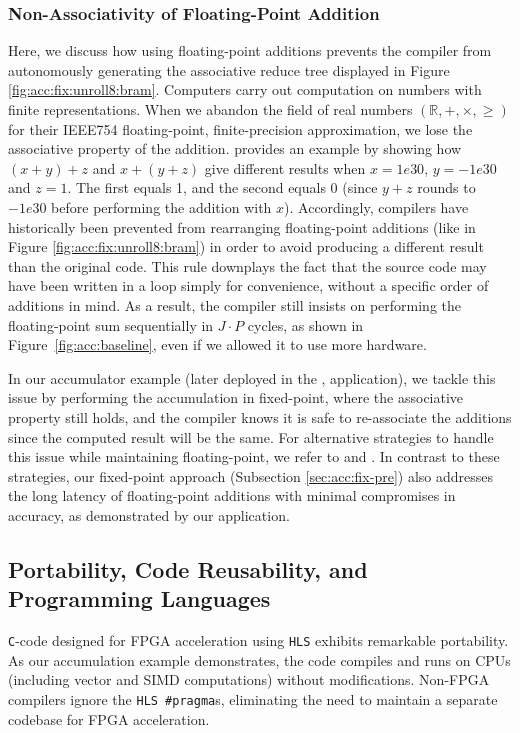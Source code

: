 \documentclass[12pt,american]{article}
\newcommand{\Naccsize}{J}
\begin{document}
\subsubsection{Non-Associativity of Floating-Point Addition} 

Here, we discuss how using floating-point additions prevents the compiler from autonomously generating the associative reduce tree displayed in Figure \ref{fig:acc:fix:unroll8:bram}. Computers carry out computation on numbers with finite representations. When we abandon the field of real numbers $(\mathbb{R},+,\times,\geq)$ for their IEEE754 floating-point, finite-precision approximation, we lose the associative property of the addition. \citet{Goldberg1991} provides an example by showing how $(x + y) +z$ and $x + (y +z)$ give different results when $x = 1e30$, $y = -1e30$ and $z = 1$. The first equals 1, and the second equals 0 (since $y+z$ rounds to $-1e30$ before performing the addition with $x$). Accordingly, compilers have historically been prevented from rearranging floating-point additions (like in Figure \ref{fig:acc:fix:unroll8:bram}) in order to avoid producing a different result than the original code. This rule downplays the fact that the source code may have been written in a loop simply for convenience, without a specific order of additions in mind. As a result, the compiler still insists on performing the floating-point sum sequentially in $\Naccsize\cdot P$ cycles, as shown in Figure~\ref{fig:acc:baseline}, even if we allowed it to use more hardware.

In our accumulator example (later deployed in the \citealp{KrusellSmith1998}, application), we tackle this issue by performing the accumulation in fixed-point, where the associative property still holds, and the compiler knows it is safe to re-associate the additions since the computed result will be the same. For alternative strategies to handle this issue while maintaining floating-point, we refer to \cite{hrica2012floating} and \cite{kadric2016accurate}. In contrast to these strategies, our fixed-point approach (Subsection \ref{sec:acc:fix-pre}) also addresses the long latency of floating-point additions with minimal compromises in accuracy, as demonstrated by our application.

\subsection{Portability, Code Reusability, and Programming Languages}

\texttt{C}-code designed for FPGA acceleration using \texttt{HLS} exhibits remarkable portability. As our accumulation example demonstrates, the code compiles and runs on CPUs (including vector and SIMD computations) without modifications. Non-FPGA compilers ignore the \texttt{HLS \#pragma}s, eliminating the need to maintain a separate codebase for FPGA acceleration. 
\end{document}
